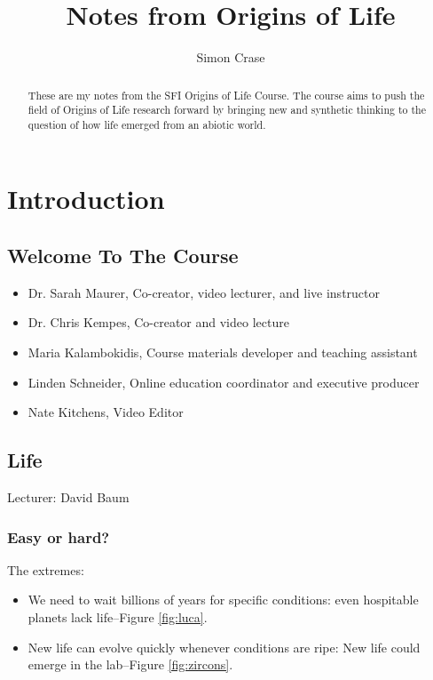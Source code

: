 \documentclass[]{article}
\title{Notes from Origins of Life}
\author{Simon Crase}
\begin{document}
\maketitle

\begin{abstract}
    These are my notes from the SFI Origins of Life Course\cite{sfi2019}. The course aims to push the field of Origins of Life research forward by bringing new and synthetic thinking to the question of how life emerged from an abiotic world.

\end{abstract}

\setcounter{tocdepth}{2}
\tableofcontents


\section{Introduction}
\subsection{Welcome To The Course}
\begin{itemize}
	\item Dr. Sarah Maurer, Co-creator, video lecturer, and live instructor
	\item Dr. Chris Kempes, Co-creator and video lecture
	\item Maria Kalambokidis, Course materials developer and teaching assistant
	\item Linden Schneider, Online education coordinator and executive producer
	\item Nate Kitchens, Video Editor
\end{itemize}
\subsection{Life}
Lecturer: David Baum
\subsubsection{Easy or hard?}
The extremes:
\begin{itemize}
	\item We need to wait billions of years for specific conditions: even hospitable planets lack life--Figure \ref{fig:luca}.
	\item New life can evolve quickly whenever conditions are ripe:  New life could emerge in the lab--Figure \ref{fig:zircons}.
\end{itemize}
\end{document}
